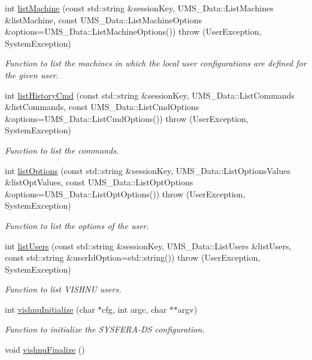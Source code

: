 \begin{DoxyCompactItemize}
int \hyperlink{namespacevishnu_a59e26ccbe8510d774528c86511f7476b}{listMachine} (const std::string \&sessionKey, UMS\_\-Data::ListMachines \&listMachine, const UMS\_\-Data::ListMachineOptions \&options=UMS\_\-Data::ListMachineOptions())  throw (UserException, SystemException)
\begin{DoxyCompactList}\small\item\em Function to list the machines in which the local user configurations are defined for the given user. \item\end{DoxyCompactList}\item 
int \hyperlink{namespacevishnu_a8576a50af31abe3869a61bec780aa5ef}{listHistoryCmd} (const std::string \&sessionKey, UMS\_\-Data::ListCommands \&listCommands, const UMS\_\-Data::ListCmdOptions \&options=UMS\_\-Data::ListCmdOptions())  throw (UserException, SystemException)
\begin{DoxyCompactList}\small\item\em Function to list the commands. \item\end{DoxyCompactList}\item 
int \hyperlink{namespacevishnu_a53106e021a6e98049b41106c12356e28}{listOptions} (const std::string \&sessionKey, UMS\_\-Data::ListOptionsValues \&listOptValues, const UMS\_\-Data::ListOptOptions \&options=UMS\_\-Data::ListOptOptions())  throw (UserException, SystemException)
\begin{DoxyCompactList}\small\item\em Function to list the options of the user. \item\end{DoxyCompactList}\item 
int \hyperlink{namespacevishnu_a6a0175686b0d2aff434015fc61c62ce6}{listUsers} (const std::string \&sessionKey, UMS\_\-Data::ListUsers \&listUsers, const std::string \&userIdOption=std::string())  throw (UserException, SystemException)
\begin{DoxyCompactList}\small\item\em Function to list VISHNU users. \item\end{DoxyCompactList}\item 
int \hyperlink{namespacevishnu_adc7892040980c12dd70ed3228f350313}{vishnuInitialize} (char $\ast$cfg, int argc, char $\ast$$\ast$argv)
\begin{DoxyCompactList}\small\item\em Function to initialize the SYSFERA-\/DS configuration. \item\end{DoxyCompactList}\item 
\hypertarget{namespacevishnu_a5ef439295f52f8055a0771ae9f257b68}{
void \hyperlink{namespacevishnu_a5ef439295f52f8055a0771ae9f257b68}{vishnuFinalize} ()}
\label{namespacevishnu_a5ef439295f52f8055a0771ae9f257b68}


\end{DoxyCompactItemize}
